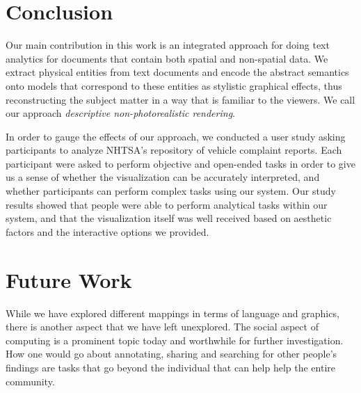 \section{Conclusion}
Our main contribution in this work is an integrated approach for doing text
analytics for documents that contain both spatial and non-spatial data. We extract
physical entities from text documents and encode the abstract semantics onto 
\threed models that correspond to these entities as stylistic graphical effects, thus 
reconstructing the subject matter in a way that is familiar to the viewers. We call
our approach \emph{descriptive non-photorealistic rendering}.

In order to gauge the effects of our approach, we conducted a user study
asking participants to analyze NHTSA's repository of vehicle complaint reports.
Each participant were asked to perform objective and open-ended tasks in order to 
give us a sense of whether the visualization can be accurately interpreted, and whether
participants can perform complex tasks using our system.
Our study results showed that people were able to perform analytical tasks
within our system, and that the visualization itself was well received based on
aesthetic factors and the interactive options we provided. 








\section{Future Work}
While we have explored different mappings in terms of language and graphics,
there is another aspect that we have left unexplored. The social aspect of
computing is a prominent topic today and worthwhile for further investigation.
How one would go about annotating, sharing and searching for other people's
findings are tasks that go beyond the individual that can help help the entire
community.

